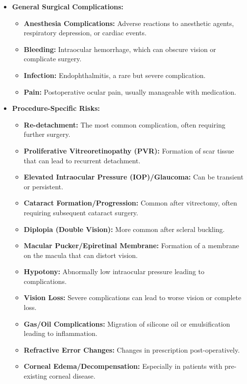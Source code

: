 \begin{itemize}
  \item \textbf{General Surgical Complications:}
    \begin{itemize}
      \item \textbf{Anesthesia Complications:} Adverse reactions to anesthetic agents, respiratory depression, or cardiac events.
      \item \textbf{Bleeding:} Intraocular hemorrhage, which can obscure vision or complicate surgery.
      \item \textbf{Infection:} Endophthalmitis, a rare but severe complication.
      \item \textbf{Pain:} Postoperative ocular pain, usually manageable with medication.
    \end{itemize}
  
  \item \textbf{Procedure-Specific Risks:}
    \begin{itemize}
      \item \textbf{Re-detachment:} The most common complication, often requiring further surgery.
      \item \textbf{Proliferative Vitreoretinopathy (PVR):} Formation of scar tissue that can lead to recurrent detachment.
      \item \textbf{Elevated Intraocular Pressure (IOP)/Glaucoma:} Can be transient or persistent.
      \item \textbf{Cataract Formation/Progression:} Common after vitrectomy, often requiring subsequent cataract surgery.
      \item \textbf{Diplopia (Double Vision):} More common after scleral buckling.
      \item \textbf{Macular Pucker/Epiretinal Membrane:} Formation of a membrane on the macula that can distort vision.
      \item \textbf{Hypotony:} Abnormally low intraocular pressure leading to complications.
      \item \textbf{Vision Loss:} Severe complications can lead to worse vision or complete loss.
      \item \textbf{Gas/Oil Complications:} Migration of silicone oil or emulsification leading to inflammation.
      \item \textbf{Refractive Error Changes:} Changes in prescription post-operatively.
      \item \textbf{Corneal Edema/Decompensation:} Especially in patients with pre-existing corneal disease.
    \end{itemize}
\end{itemize}

